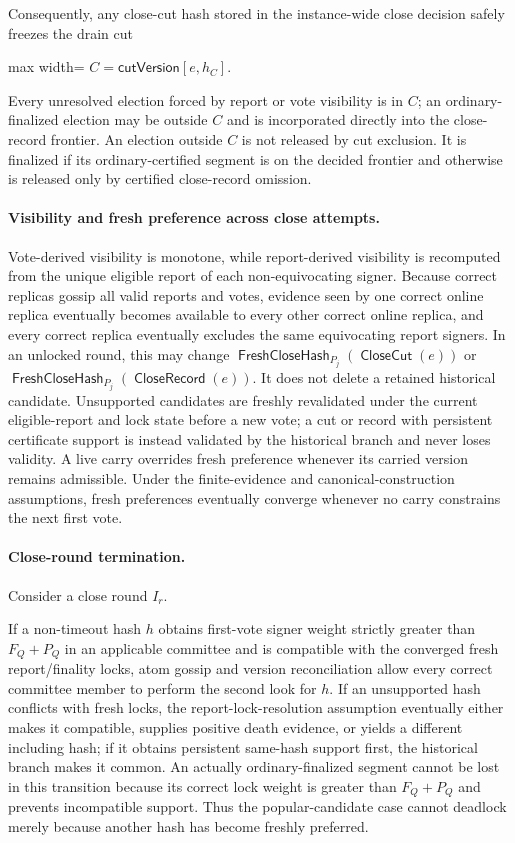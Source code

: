 \documentclass[sigplan,twocolumn,review,anonymous]{acmart}
\newcommand{\func}[1]{\operatorname{\mathsf{#1}}}
\newcommand{\CloseCut}{\func{CloseCut}}
\newcommand{\CloseRecord}{\func{CloseRecord}}
\newcommand{\FreshCloseHash}{\func{FreshCloseHash}}
\newcommand{\cutVersion}{\mathsf{cutVersion}}
\begin{document}
Consequently, any close-cut hash stored in the instance-wide close decision safely freezes the drain cut
\begin{center}
\begin{adjustbox}{max width=\columnwidth}
\(\displaystyle
C=\cutVersion[e,h_C].
\)
\end{adjustbox}
\end{center}
Every unresolved election forced by report or vote visibility is in \(C\); an ordinary-finalized
election may be outside \(C\) and is incorporated directly into the close-record frontier.  An election
outside \(C\) is not released by cut exclusion.  It is finalized if its ordinary-certified segment is
on the decided frontier and otherwise is released only by certified close-record omission.

\paragraph{Visibility and fresh preference across close attempts.}
Vote-derived visibility is monotone, while report-derived visibility is recomputed from the unique
eligible report of each non-equivocating signer.  Because correct replicas gossip all valid reports and
votes, evidence seen by one correct online replica eventually becomes available to every other correct
online replica, and every correct replica eventually excludes the same equivocating report signers.
In an unlocked round, this may change \(\FreshCloseHash_{P_j}(\CloseCut(e))\) or
\(\FreshCloseHash_{P_j}(\CloseRecord(e))\).  It does not delete a retained historical candidate.
Unsupported candidates are freshly revalidated under the current eligible-report and lock state before
a new vote; a cut or record with persistent certificate support is instead validated by the historical
branch and never loses validity.  A live carry overrides fresh preference whenever its carried version
remains admissible.  Under the
finite-evidence and canonical-construction assumptions,
fresh preferences eventually converge whenever no carry constrains the next first vote.

\paragraph{Close-round termination.}
Consider a close round \(I_r\).

If a non-timeout hash \(h\) obtains first-vote signer weight strictly greater than \(F_Q+P_Q\) in an
applicable committee and is compatible with the converged fresh report/finality locks, atom gossip and
version reconciliation allow every correct committee member to perform the second look for \(h\).  If
an unsupported hash conflicts with fresh locks, the report-lock-resolution assumption eventually either
makes it compatible, supplies positive death evidence, or yields a different including hash; if it
obtains persistent same-hash support first, the historical branch makes it common.  An actually
ordinary-finalized segment cannot be lost in this transition because its correct lock weight is greater
than \(F_Q+P_Q\) and prevents incompatible support.  Thus the popular-candidate case cannot deadlock
merely because another hash has become freshly preferred.
\end{document}
